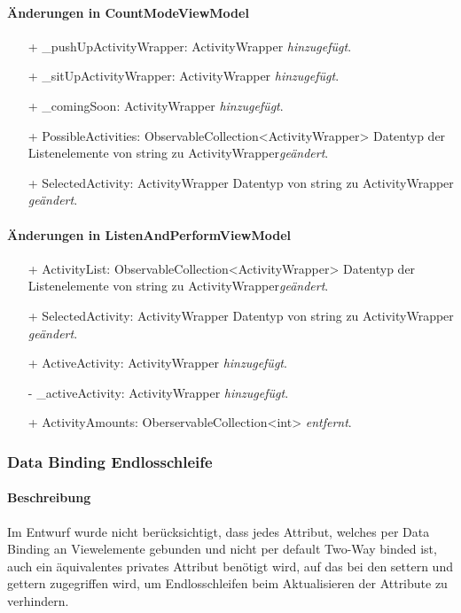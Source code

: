 \documentclass[a4paper,12pt]{article}
\begin{document}
\paragraph{Änderungen in CountModeViewModel}
\begin{itemize}
	\item[+] \_pushUpActivityWrapper: ActivityWrapper \textit{hinzugefügt}.
	\item[+] \_sitUpActivityWrapper: ActivityWrapper \textit{hinzugefügt}.
	\item[+] \_comingSoon: ActivityWrapper \textit{hinzugefügt}.
	\item[+] PossibleActivities: ObservableCollection<ActivityWrapper> Datentyp der Listenelemente von string zu ActivityWrapper\textit{geändert}.
	\item[+] SelectedActivity: ActivityWrapper Datentyp von string zu ActivityWrapper \textit{geändert}.
\end{itemize}
\paragraph{Änderungen in ListenAndPerformViewModel}
\begin{itemize}
	\item[+] ActivityList: ObservableCollection<ActivityWrapper> Datentyp der Listenelemente von string zu ActivityWrapper\textit{geändert}.
	\item[+] SelectedActivity: ActivityWrapper Datentyp von string zu ActivityWrapper \textit{geändert}.
	\item[+] ActiveActivity: ActivityWrapper \textit{hinzugefügt}.
	\item[-] \_activeActivity: ActivityWrapper \textit{hinzugefügt}.
 	\item[+] ActivityAmounts: OberservableCollection<int> \textit{entfernt}. 
\end{itemize}

\subsubsection{Data Binding Endlosschleife}
\paragraph{Beschreibung}
Im Entwurf wurde nicht berücksichtigt, dass jedes Attribut, welches per Data Binding an Viewelemente gebunden und nicht per default Two-Way binded ist,  auch ein äquivalentes privates Attribut benötigt wird, auf das bei den settern und gettern zugegriffen wird, um Endlosschleifen beim Aktualisieren der Attribute zu verhindern. 
\end{document}

